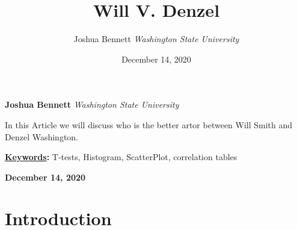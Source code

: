 \documentclass[]{article}
\title{\textbf{\textcolor{WSU.crimson}{Will V. Denzel}}  }
\author{\Large Joshua
Bennett\vspace{0.05in} \newline\normalsize\emph{Washington State
University}  }
\date{December 14, 2020}
\newcommand*{\authorfont}{\fontfamily{phv}\selectfont}
\renewenvironment{abstract}
 {{%
    \setlength{\leftmargin}{0mm}
    \setlength{\rightmargin}{\leftmargin}%
  }%
  \relax}
 {\endlist}
\begin{document}
	
%    


{%
\setlength{\parindent}{0pt}
\thispagestyle{plain}
{\fontsize{18}{20}\selectfont\raggedright 
\maketitle  %

}

{
   \vskip 13.5pt\relax \normalsize\fontsize{11}{12} 
   
\textbf{\authorfont Joshua Bennett} \hskip 15pt \emph{\small Washington
State University}   

}

}








\begin{abstract}

    \hbox{\vrule height .2pt width 39.14pc}

    \vskip 8.5pt %

\noindent In this Article we will discuss who is the better artor
between Will Smith and Denzel Washington.


\vskip 8.5pt \noindent \textbf{\underline{Keywords}:} T-tests,
Histogram, ScatterPlot, correlation tables \par

    




    
    \hbox{\vrule height .2pt width 39.14pc}
    \vskip 5pt 
    \hfill \textbf{\textcolor{WSU.gray}{ December 14, 2020 } }
    \vskip 5pt 
    
\end{abstract}


\vskip -8.5pt




\noindent  

\section{Introduction}
\label{sec:intro}
\end{document}
